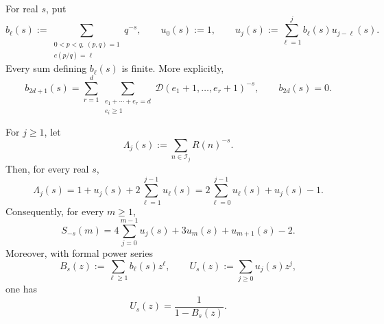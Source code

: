 For real \(s\), put
\begin{equation}
 b_\ell(s):=
 \sum_{\substack{0<p<q,\ (p,q)=1\\c(p/q)=\ell}}q^{-s},
 \qquad
 u_0(s):=1,\qquad
 u_j(s):=\sum_{\ell=1}^j b_\ell(s)u_{j-\ell}(s).
 \label{eq:weighted-renewal-coefficients}
\end{equation}
Every sum defining \(b_\ell(s)\) is finite.  More explicitly,
\begin{equation}
 b_{2d+1}(s)
 =\sum_{r=1}^d
   \sum_{\substack{e_1+\cdots+e_r=d\\e_i\ge1}}
   \mathcal D(e_1+1,\ldots,e_r+1)^{-s},
 \qquad b_{2d}(s)=0.
 \label{eq:weighted-letter-coefficients}
\end{equation}

\begin{proposition}
\label{prop:weighted-generator-renewal}
For \(j\ge1\), let
\[
 \Lambda_j(s):=\sum_{n\in\mathcal I_j}R(n)^{-s}.
\]
Then, for every real \(s\),
\begin{equation}
 \Lambda_j(s)
 =1+u_j(s)+2\sum_{\ell=1}^{j-1}u_\ell(s)
 =2\sum_{\ell=0}^{j-1}u_\ell(s)+u_j(s)-1.
 \label{eq:weighted-layer-renewal}
\end{equation}
Consequently, for every \(m\ge1\),
\begin{equation}
 S_{-s}(m)
 =4\sum_{j=0}^{m-1}u_j(s)+3u_m(s)+u_{m+1}(s)-2.
 \label{eq:weighted-window-renewal}
\end{equation}
Moreover, with formal power series
\[
 B_s(z):=\sum_{\ell\ge1}b_\ell(s)z^\ell,
 \qquad U_s(z):=\sum_{j\ge0}u_j(s)z^j,
\]
one has
\begin{equation}
 U_s(z)=\frac1{1-B_s(z)}.
 \label{eq:weighted-renewal-generating-function}
\end{equation}
\end{proposition}

